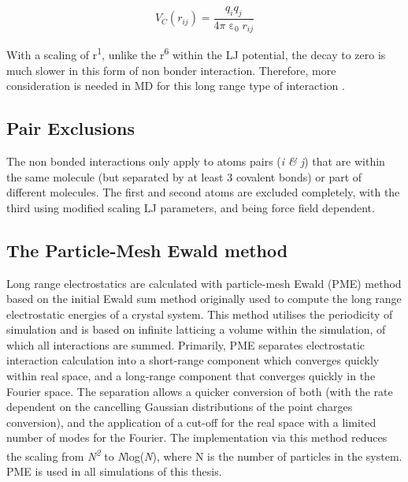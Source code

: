 \begin{equation}
V_{C} (r_{ij}) = \frac{q_i q_j}{4 \pi \upepsilon_0 r_{ij}}
\label{eq:Coulomb}
\end{equation}
 
With a scaling of r\textsuperscript{1}, unlike the r\textsuperscript{6} within the LJ potential, the decay to zero is much slower in this form of non bonder interaction. Therefore, more consideration is needed in MD for this long range type of interaction \cite{Tieleman2010}. 

\subsection{Pair Exclusions}

The non bonded interactions only apply to atoms pairs (\textit{i \& j}) that are within the same molecule (but separated by at least 3 covalent bonds) or part of different molecules. The first and second atoms are excluded completely, with the third using modified scaling LJ parameters, and being force field dependent. 


\subsection{The Particle-Mesh Ewald method}

Long range electrostatics are calculated with particle-mesh Ewald (PME) method \cite{Darden1993,Essmann1995} based on the initial Ewald sum method \cite{Ewald1921} originally used to compute the long range electrostatic energies of a crystal system. This method utilises the periodicity of simulation and is based on infinite latticing a volume within the simulation, of which all interactions are summed. Primarily, PME separates electrostatic interaction calculation into a short-range component which converges quickly within real space, and a long-range component that converges quickly in the Fourier space. The separation allows a quicker conversion of both (with the rate dependent on the cancelling Gaussian distributions of the point charges conversion), and the application of a cut-off for the real space with a limited number of modes for the Fourier. The implementation via this method reduces the scaling from \textit{N\textsuperscript{2}} to \textit{N}log(\textit{N}), where N is the number of particles in the system. PME is used in all simulations of this thesis. 


